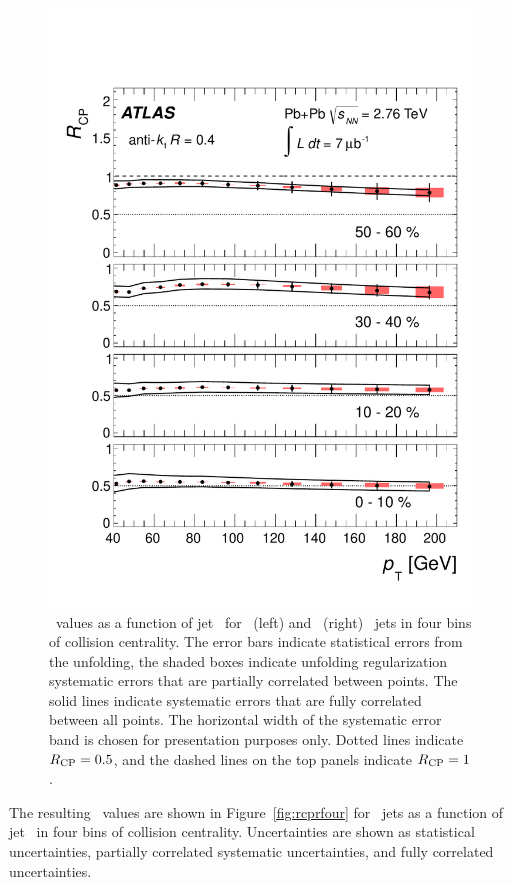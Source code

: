 \begin{figure}[!h]
\begin{center}
\includegraphics[width=0.49\mboxwidth]{jetfigures/ATLAS_jetRCP_04.pdf}
\caption{
 \Rcp\ values as a function of jet
\pT\ for \RTwo\ (left) and \RFour\ (right) \antikt\ jets
in four bins of collision centrality. The error bars indicate
statistical errors from the unfolding, the shaded boxes indicate
unfolding regularization systematic errors that are partially
correlated between points. The solid lines indicate
systematic errors that are fully correlated between all points.
The horizontal width of the systematic error band is chosen for
presentation purposes only. Dotted lines indicate $\mbox{$R_{\rm CP}$} =
0.5$, and the dashed lines on the top panels indicate $\mbox{$R_{\rm CP}$} = 1$.
}
\label{fig:GR:ATLAS_jet_rcp}
\end{center}
\end{figure}
The resulting \Rcp\ values are shown in Figure~\ref{fig:rcprfour} 
for  \RFour\ jets as a function of jet \pT\ in four bins
of collision centrality.
Uncertainties are shown as statistical uncertainties, partially correlated systematic
uncertainties, and fully correlated uncertainties.

